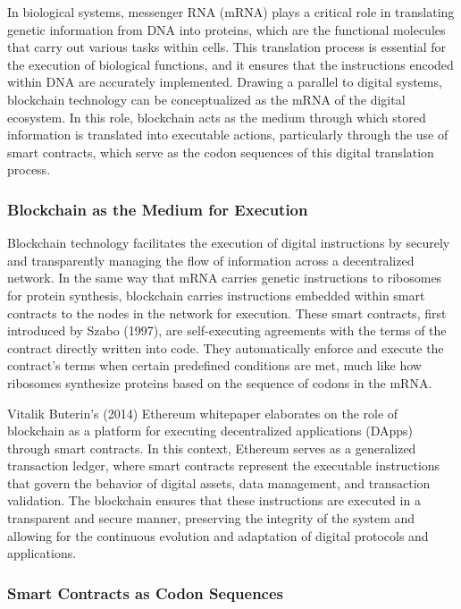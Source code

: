 \documentclass[12pt,twoside]{article}
\begin{document}
In biological systems, messenger RNA (mRNA) plays a critical role in translating genetic information from DNA into proteins, which are the functional molecules that carry out various tasks within cells. This translation process is essential for the execution of biological functions, and it ensures that the instructions encoded within DNA are accurately implemented. Drawing a parallel to digital systems, blockchain technology can be conceptualized as the mRNA of the digital ecosystem. In this role, blockchain acts as the medium through which stored information is translated into executable actions, particularly through the use of smart contracts, which serve as the codon sequences of this digital translation process.

\subsubsection{Blockchain as the Medium for Execution}

Blockchain technology facilitates the execution of digital instructions by securely and transparently managing the flow of information across a decentralized network. In the same way that mRNA carries genetic instructions to ribosomes for protein synthesis, blockchain carries instructions embedded within smart contracts to the nodes in the network for execution. These smart contracts, first introduced by Szabo (1997), are self-executing agreements with the terms of the contract directly written into code. They automatically enforce and execute the contract’s terms when certain predefined conditions are met, much like how ribosomes synthesize proteins based on the sequence of codons in the mRNA.

Vitalik Buterin’s (2014) Ethereum whitepaper elaborates on the role of blockchain as a platform for executing decentralized applications (DApps) through smart contracts. In this context, Ethereum serves as a generalized transaction ledger, where smart contracts represent the executable instructions that govern the behavior of digital assets, data management, and transaction validation. The blockchain ensures that these instructions are executed in a transparent and secure manner, preserving the integrity of the system and allowing for the continuous evolution and adaptation of digital protocols and applications.

\subsubsection{Smart Contracts as Codon Sequences}
\end{document}
